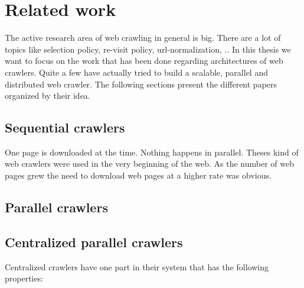 
\chapter{Related work} %

The active research area of web crawling in general is big. There are a lot of topics like selection policy, re-visit policy, url-normalization, .. In this thesis we want to focus on the work that has been done regarding architectures of web crawlers. Quite a few have actually tried to build a scalable, parallel and distributed web crawler. The following sections present the different papers organized by their idea.

\label{Chapter2} %


\section{Sequential crawlers}
One page is downloaded at the time. Nothing happens in parallel. Theses kind of web crawlers were used in the very beginning of the web. As the number of web pages grew the need to download web pages at a higher rate was obvious.



\section{Parallel crawlers}





\section{Centralized parallel crawlers}

Centralized crawlers have one part in their system that has the following properties:



